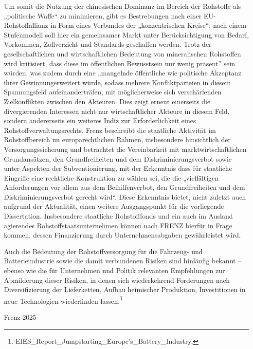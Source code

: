 \documentclass[12pt,a4paper,oneside]{book} %
\begin{document}
Um somit die Nutzung der chinesischen Dominanz im Bereich der Rohstoffe als „politische Waffe“ zu minimieren, gibt es Bestrebungen nach einer EU-Rohstoffallianz in Form eines Verbundes der „konzentrischen Kreise“; nach einem Stufenmodell soll hier ein gemeinsamer Markt unter Berücksichtigung von Bedarf, Vorkommen, Zollverzicht und Standards geschaffen werden.\autocite{sauga_klub_2023} Trotz der gesellschaftlichen und wirtschaftlichen Bedeutung von mineralischen Rohstoffen wird kritisiert, dass diese im \glqq öffentlichen Bewusstsein nur wenig präsent” sein würden, was zudem durch eine „mangelnde öffentliche wie politische Akzeptanz ihrer Gewinnung\grqq erweitert würde, sodass mehrere Konfliktparteien in diesem Spannungsfeld aufeinanderträfen, mit möglicherweise sich verschärfenden Zielkonflikten zwischen den Akteuren.\autocite{kuhne_gewinnung_2020} Dies zeigt erneut einerseits die divergierenden Interessen nicht nur wirtschaftlicher Akteure in diesem Feld, sondern andererseits ein weiteres Indiz zur Erforderlichkeit eines Rohstoffverwaltungsrechts.
Frenz beschreibt die staatliche Aktivität im Rohstoffbereich im europarechtlichen Rahmen, insbesondere hinsichtlich der Versorgungssicherung und betrachtet die Vereinbarkeit mit marktwirtschaftlichen Grundansätzen, den Grundfreiheiten und dem Diskriminierungsverbot sowie unter Aspekten der Subventionierung, mit der Erkenntnis dass für staatliche Eingriffe eine rechtliche Konstruktion zu wählen sei, die die „vielfältigen Anforderungen vor allem aus dem Beihilfenverbot, den Grundfreiheiten und dem Diskriminierungsverbot gerecht wird“.\autocite{frenz_staatliche_2023} Diese Erkenntnis bietet, nicht zuletzt auch aufgrund der Aktualität, einen weitere Ausgangspunkt für die vorliegende Dissertation. Insbesondere staatliche Rohstofffonds und ein auch im Ausland agierendes Rohstoffstaatsunternehmen können nach FRENZ hierfür in Frage kommen, dessen Finanzierung durch Unternehmensabgaben gewährleistet wird.\autocite{frenz_unternehmensabgabe_2023}

Auch die Bedeutung der Rohstoffversorgung für die Fahrzeug- und Batterieindustrie sowie die damit verbundenen Risiken sind hinläufig bekannt -- ebenso wie die für Unternehmen und Politik relevanten Empfehlungen zur Abmilderung dieser Risiken, in denen sich wiederkehrend Forderungen nach Diversifizierung der Lieferketten, Aufbau heimischer Produktion, Investitionen in neue Technologien wiederfinden lassen.\footnote{EIES_Report_Jumpstarting_Europe’s_Battery_Industry, }

Frenz 2025
\end{document}
